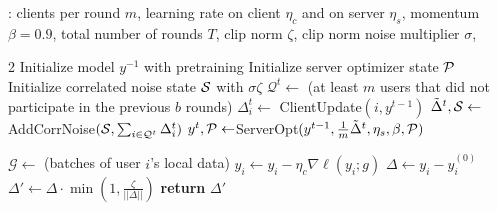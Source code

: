 \begin{algorithm}[thb]
\caption{\small FedAvg~\citep{mcmahan18learning} with \colorbox{blue!25}{DP-FTRL~\citep{kairouz21practical}} for \colorbox{blue!25}{DP} FL}
\label{algo:dpfl}
\begin{algorithmic}
\INPUT: clients per round $m$, learning rate on client $\eta_{c}$ and on server $\eta_{s}$, momentum $\beta=0.9$,  total number of rounds $T$, \colorbox{blue!25}{clip norm $\zeta$, clip norm noise multiplier $\sigma$,} 
\begin{multicols}{2}
\STATE Initialize model $y^{-1}$ with pretraining
\STATE Initialize server optimizer state $\mathcal{P}$
\STATE \colorbox{blue!25}{Initialize correlated noise state $\mathbf{\mathcal{S}}$ with $\sigma \zeta$}
\STATE $\mathcal{Q}^t \leftarrow$ (at least $m$ users that did not participate in the previous $b$ rounds)
\STATE $\Delta^{t}_i \leftarrow$ ClientUpdate$(i, y^{t-1})$
\ENDFOR
\vspace{0.1cm}
\STATE \colorbox{blue!25}{$\tilde{\Delta}^t, \mathbf{\mathcal{S}} \leftarrow$AddCorrNoise$(\mathbf{\mathcal{S}}, \sum_{i \in \mathcal{Q}^t} \Delta^{t}_i)$}
\vspace{0.1cm}
\STATE $y^{t}, \mathcal{P} \leftarrow$ServerOpt$(y^{t-1}, \frac{1}{m}\tilde{\Delta}^t, \eta_{s}, \beta, \mathcal{P})$ 
\ENDFOR

\begin{mdframed}[
    linecolor=black,
    linewidth=1.5pt,
    roundcorner=4pt,
    userdefinedwidth=\linewidth,
]
\STATE $\mathcal{G} \leftarrow $ (batches of user $i$'s local data)
\STATE $y_i \leftarrow y_i - \eta_c \nabla \ell(y_i;g)$
\ENDFOR
\STATE $\Delta \leftarrow y_i - y_i^{(0)}$
\STATE \colorbox{blue!25}{$\Delta' \leftarrow \Delta \cdot \min{\left(1, \frac{\zeta}{||\Delta||}\right)}$}
\STATE \textbf{return} $\Delta'$
\ENDFUNCTION
\end{mdframed}
\end{multicols}
\end{algorithmic}
\vspace{-0.2cm}
\end{algorithm}